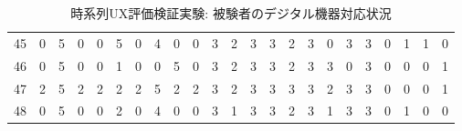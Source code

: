 \begin{table}[htbp]
{\begin{tabular}{lllllllllllllllllllllll}
45                  & 0 & 5 & 0 & 0 & 5 & 0 & 4 & 0 & 0 & 3 & 2 & 3 & 3 & 2 & 3 & 0 & 3 & 3 & 0                  & 1                   & 1                   &   0                  \\
46                  & 0 & 5 & 0 & 0 & 1 & 0 & 0 & 5 & 0 & 3 & 2 & 3 & 3 & 2 & 3 & 3 & 0 & 3 & 0                  & 0                   & 0                   & 1                   \\
47                  & 2 & 5 & 2 & 2 & 2 & 2 & 5 & 2 & 2 & 3 & 2 & 3 & 3 & 3 & 3 & 2 & 3 & 3 & 0                  & 0                   & 0                   & 1                   \\
48                  & 0 & 5 & 0 & 0 & 2 & 0 & 4 & 0 & 0 & 3 & 1 & 3 & 3 & 2 & 3 & 1 & 3 & 3 & 0                  & 1                   & 0                   & 0                   \\ \hline
\end{tabular}
}
\caption{時系列UX評価検証実験: 被験者のデジタル機器対応状況}
\label{table:exp2result2}
\end{table}
